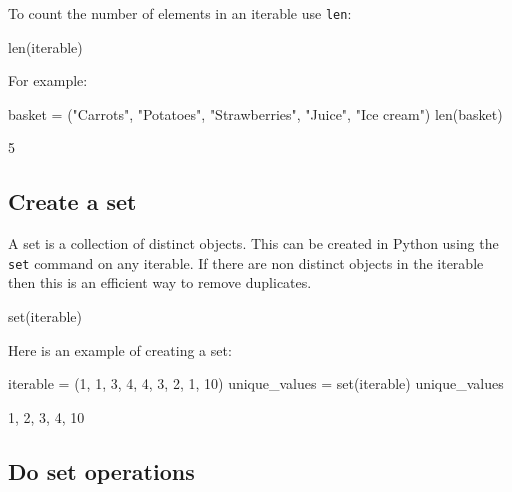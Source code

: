 To count the number of elements in an iterable use \texttt{len}:


\begin{api}
len(iterable)
\end{api}



For example:




\begin{pyin}
basket = ("Carrots", "Potatoes", "Strawberries", "Juice", "Ice cream")
len(basket)
\end{pyin}





\begin{raw}
5
\end{raw}





\subsection{Create a set}
\label{\detokenize{building-tools/02-functions-and-data-structures/how/main:create-a-set}}

A set is a collection of distinct objects. This can be created in Python using
the \texttt{set} command on any iterable. If there are non distinct objects in the
iterable then this is an efficient way to remove duplicates.


\begin{api}
set(iterable)
\end{api}



Here is an example of creating a set:




\begin{pyin}
iterable = (1, 1, 3, 4, 4, 3, 2, 1, 10)
unique_values = set(iterable)
unique_values
\end{pyin}





\begin{raw}
{1, 2, 3, 4, 10}
\end{raw}





\subsection{Do set operations}
\label{\detokenize{building-tools/02-functions-and-data-structures/how/main:do-set-operations}}

